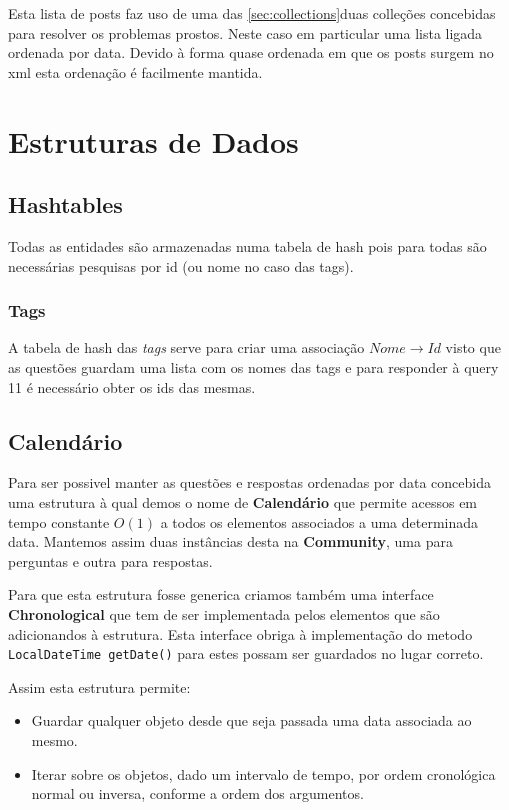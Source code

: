 \documentclass[10pt,a4paper]{report}
\begin{document}
    Esta lista de posts faz uso de uma das \ref{sec:collections}{duas colleções}
    concebidas para resolver os problemas prostos. Neste caso em particular uma
    lista ligada ordenada por data. Devido à forma quase ordenada em que os posts
    surgem no xml esta ordenação é facilmente mantida.


\chapter{Estruturas de Dados}
    \section{Hashtables}
        Todas as entidades são armazenadas numa tabela de hash pois para todas
        são necessárias pesquisas por id (ou nome no caso das tags).

        \subsection{Tags}
        A tabela de hash das \textit{tags} serve para criar uma associação
        $Nome \to Id$ visto que as questões guardam uma lista com os nomes das
        tags e para responder à query 11 é necessário obter os ids das mesmas.

    \section{Calendário}
        Para ser possivel manter as questões e respostas ordenadas por data
        concebida uma estrutura à qual demos o nome de \textbf{Calendário} que
        permite acessos em tempo constante $O(1)$ a todos os elementos associados
        a uma determinada data. Mantemos assim duas instâncias desta na
        \textbf{Community}, uma para perguntas e outra para respostas.

        Para que esta estrutura fosse generica criamos também uma interface
        \textbf{Chronological} que tem de ser implementada pelos elementos
        que são adicionandos à estrutura. Esta interface obriga à implementação
        do metodo \texttt{LocalDateTime getDate()} para estes possam
        ser guardados no lugar correto.

        Assim esta estrutura permite:
        \begin{itemize}
                \item Guardar qualquer objeto desde que seja
                      passada uma data associada ao mesmo.
                \item Iterar sobre os objetos, dado um intervalo de tempo,
                      por ordem cronológica normal ou inversa, conforme a
                      ordem dos argumentos.
        \end{itemize}
\end{document}
